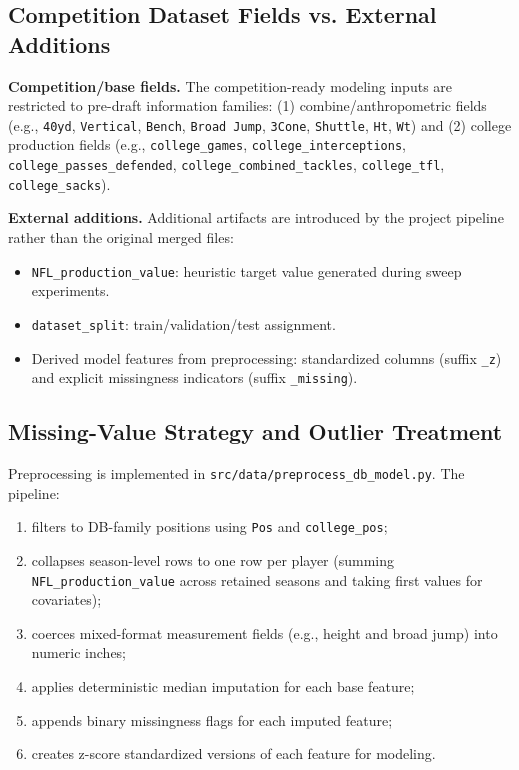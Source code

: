 \subsection{Competition Dataset Fields vs. External Additions}

\textbf{Competition/base fields.} The competition-ready modeling inputs are restricted to pre-draft information families:
(1) combine/anthropometric fields (e.g., \texttt{40yd}, \texttt{Vertical}, \texttt{Bench}, \texttt{Broad Jump}, \texttt{3Cone}, \texttt{Shuttle}, \texttt{Ht}, \texttt{Wt}) and
(2) college production fields (e.g., \texttt{college\_games}, \texttt{college\_interceptions}, \texttt{college\_passes\_defended}, \texttt{college\_combined\_tackles}, \texttt{college\_tfl}, \texttt{college\_sacks}).

\textbf{External additions.} Additional artifacts are introduced by the project pipeline rather than the original merged files:
\begin{itemize}
    \item \texttt{NFL\_production\_value}: heuristic target value generated during sweep experiments.
    \item \texttt{dataset\_split}: train/validation/test assignment.
    \item Derived model features from preprocessing: standardized columns (suffix \texttt{\_z}) and explicit missingness indicators (suffix \texttt{\_missing}).
\end{itemize}

\subsection{Missing-Value Strategy and Outlier Treatment}

Preprocessing is implemented in \texttt{src/data/preprocess\_db\_model.py}. The pipeline:
\begin{enumerate}
    \item filters to DB-family positions using \texttt{Pos} and \texttt{college\_pos};
    \item collapses season-level rows to one row per player (summing \texttt{NFL\_production\_value} across retained seasons and taking first values for covariates);
    \item coerces mixed-format measurement fields (e.g., height and broad jump) into numeric inches;
    \item applies deterministic median imputation for each base feature;
    \item appends binary missingness flags for each imputed feature;
    \item creates z-score standardized versions of each feature for modeling.
\end{enumerate}

